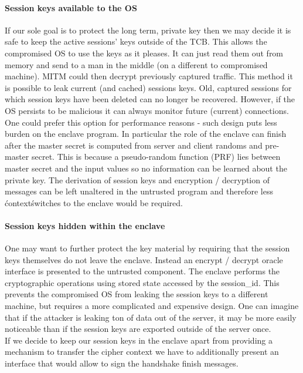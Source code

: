 \documentclass[../../main.tex]{subfiles}
\begin{document}
\paragraph{Session keys available to the OS}

If our sole goal is to protect the long term, private key then we may
decide it is safe to keep the active sessions' keys outside of the
TCB. This allows the compromised OS to use the keys as it pleases. It
can just read them out from memory and send to a man in the middle (on
a different to compromised machine). MITM could then decrypt
previously captured traffic. This method it is possible to leak
current (and cached) sessions keys. Old, captured sessions for which
session keys have been deleted can no longer be recovered. However, if
the OS persists to be malicious it can always monitor future (current)
connections.\\

\noindent One could prefer this option for performance reasons - such
design puts less burden on the enclave program. In particular the role
of the enclave can finish after the master secret is computed from
server and client randoms and pre-master secret. This is because a
pseudo-random function (PRF) lies between master secret and the input
values so no information can be learned about the private key. The
derivation of session keys and encryption / decryption of messages can
be left unaltered in the untrusted program and therefore less
\'context\' switches to the enclave would be required.

\paragraph{Session keys hidden within the enclave}

One may want to further protect the key material by requiring that the
session keys themselves do not leave the enclave. Instead an encrypt /
decrypt oracle interface is presented to the untrusted component. The
enclave performs the cryptographic operations using stored state
accessed by the session\_id. This prevents the compromised OS from
leaking the session keys to a different machine, but requires a more
complicated and expensive design. One can imagine that if the attacker
is leaking ton of data out of the server, it may be more easily
noticeable than if the session keys are exported outside of the server
once.\\

\noindent If we decide to keep our session keys in the enclave apart
from providing a mechanism to transfer the cipher context we have to
additionally present an interface that would allow to sign the
handshake finish messages.\\
\end{document}
